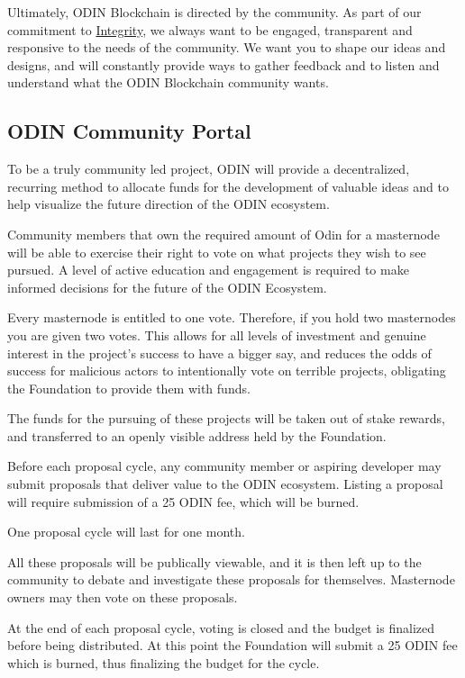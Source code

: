 Ultimately, ODIN Blockchain is directed by the community. As part of our commitment to \href{https://odinblockchain.org/#integrity}{Integrity}, we always want to be engaged, transparent and responsive to the needs of the community. We want you to shape our ideas and designs, and will constantly provide ways to gather feedback and to listen and understand what the ODIN Blockchain community wants.

\subsection{ODIN Community Portal}
To be a truly community led project, ODIN will provide a decentralized, recurring method to allocate funds for the development of valuable ideas and to help visualize the future direction of the ODIN ecosystem.

Community members that own the required amount of Odin for a masternode will be able to exercise their right to vote on what projects they wish to see pursued. A level of active education and engagement is required to make informed decisions for the future of the ODIN Ecosystem. 

Every masternode is entitled to one vote. Therefore, if you hold two masternodes you are given two votes. This allows for all levels of investment and genuine interest in the project’s success to have a bigger say, and reduces the odds of success for malicious actors to intentionally vote on terrible projects, obligating the Foundation to provide them with funds.

The funds for the pursuing of these projects will be taken out of stake rewards, and transferred to an openly visible address held by the Foundation.

Before each proposal cycle, any community member or aspiring developer may submit proposals that deliver value to the ODIN ecosystem. Listing a proposal will require submission of a 25 ODIN fee, which will be burned.

One proposal cycle will last for one month.

All these proposals will be publically viewable, and it is then left up to the community to debate and investigate these proposals for themselves. Masternode owners may then vote on these proposals.

At the end of each proposal cycle, voting is closed and the budget is finalized before being distributed. At this point the Foundation will submit a 25 ODIN fee which is burned, thus finalizing the budget for the cycle.


